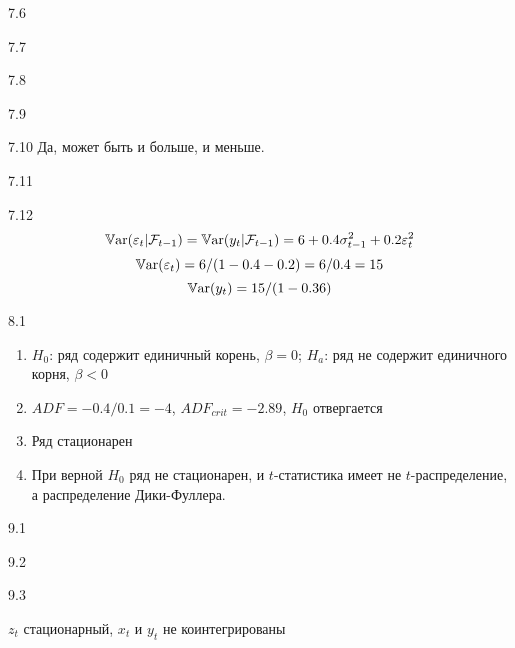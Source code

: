 \begin{solution}{{7.6}}
\end{solution}
\protect \hypertarget {soln:7.7}{}
\begin{solution}{{7.7}}
\end{solution}
\protect \hypertarget {soln:7.8}{}
\begin{solution}{{7.8}}
\end{solution}
\protect \hypertarget {soln:7.9}{}
\begin{solution}{{7.9}}
\end{solution}
\protect \hypertarget {soln:7.10}{}
\begin{solution}{{7.10}}
Да, может быть и больше, и меньше.
\end{solution}
\protect \hypertarget {soln:7.11}{}
\begin{solution}{{7.11}}

\end{solution}
\protect \hypertarget {soln:7.12}{}
\begin{solution}{{7.12}}
\[
\operatorname{\mathbb{V}\mathrm{ar}}(\varepsilon_t | \mathcal{F}_{t-1}) = \operatorname{\mathbb{V}\mathrm{ar}}(y_t| \mathcal{F}_{t-1}) = 6 + 0.4 \sigma^2_{t-1} + 0.2\varepsilon_t^2
\]
\[
\operatorname{\mathbb{V}\mathrm{ar}}(\varepsilon_t) = 6/(1-0.4-0.2)=6/0.4=15
\]
\[
\operatorname{\mathbb{V}\mathrm{ar}}(y_t)=15/(1-0.36)
\]
\end{solution}
\protect \hypertarget {soln:8.1}{}
\begin{solution}{{8.1}}

\begin{enumerate}
\item $H_0$: ряд содержит единичный корень, $\beta=0$; $H_a$: ряд не содержит единичного корня, $\beta<0$
\item $ADF=-0.4/0.1=-4$, $ADF_{crit}=-2.89$, $H_0$ отвергается
\item Ряд стационарен
\item При верной $H_0$ ряд не стационарен, и  $t$-статистика имеет не $t$-распределение, а распределение Дики-Фуллера.
\end{enumerate}
\end{solution}
\protect \hypertarget {soln:9.1}{}
\begin{solution}{{9.1}}

\end{solution}
\protect \hypertarget {soln:9.2}{}
\begin{solution}{{9.2}}

\end{solution}
\protect \hypertarget {soln:9.3}{}
\begin{solution}{{9.3}}

$z_t$ стационарный, $x_t$ и $y_t$ не коинтегрированы
\end{solution}
